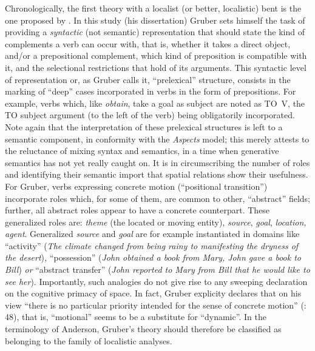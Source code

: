 \documentclass[output=paper]{langscibook}
\begin{document}
Chronologically, the first theory with a localist (or better, localistic) bent is the one proposed by \citet{gruber_studies_1965}. In this study (his dissertation) Gruber sets himself the task of providing a \textit{syntactic} (not semantic) representation that should state the kind of complements a verb can occur with, that is, whether it takes a direct object, and/or a prepositional complement, which kind of preposition is compatible with it, and the selectional restrictions that hold of its arguments. This syntactic level of representation or, as Gruber calls it, “prelexical” structure, consists in the marking of “deep” cases incorporated in verbs in the form of prepositions. For example, verbs which, like \textit{obtain}, take a goal as subject are noted as \textsc{TO~V}, the \textsc{TO} subject argument (to the left of the verb) being obligatorily incorporated. Note again that the interpretation of these prelexical structures is left to a semantic component, in conformity with the \textit{Aspects} model; this merely attests to the reluctance of mixing syntax and semantics, in a time when generative semantics has not yet really caught on. It is in circumscribing the number of roles and identifying their semantic import that spatial relations show their usefulness. For Gruber, verbs expressing concrete motion (“positional transition”) incorporate roles which, for some of them, are common to other, “abstract” fields; further, all abstract roles appear to have a concrete counterpart. These generalized roles are: \textit{theme} (the located or moving entity), \textit{source}, \textit{goal}, \textit{location, agent}. Generalized \textit{source} and \textit{goal} are for example instantiated in domains like “activity” (\textit{The climate changed from being rainy to manifesting the dryness of the desert})\textit{, }“possession” (\textit{John obtained a book from Mary, John gave a book to Bill})\textit{ or }“abstract transfer” (\textit{John reported to Mary from Bill that he would like to see her}). Importantly, such analogies do not give rise to any sweeping declaration on the cognitive primacy of space. In fact, Gruber explicity declares that on his view “there is no particular priority intended for the sense of concrete motion” (\citealt{gruber_studies_1965}: 48), that is, “motional” seems to be a substitute for “dynamic”. In the terminology of Anderson, Gruber’s theory should therefore be classified as belonging to the family of localistic analyses.
\end{document}
